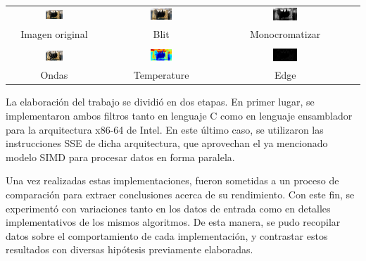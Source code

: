 \documentclass[a4paper]{article}
\begin{document}
\begin{center}
 \begin{tabular}{cccc}
   \includegraphics[width=0.2\textwidth]{imagenes/island.png} &
   \includegraphics[width=0.2\textwidth]{imagenes/island-blit.png} &
   \includegraphics[width=0.2\textwidth]{imagenes/island-monocromatizar.png} \\
   Imagen original & Blit & Monocromatizar \\
   \\
   \includegraphics[width=0.2\textwidth]{imagenes/island-ondas.png} &
   \includegraphics[width=0.2\textwidth]{imagenes/island-temperature.png} &
   \includegraphics[width=0.2\textwidth]{imagenes/island-edge.png} \\
   Ondas & Temperature & Edge \\
 \end{tabular}
\end{center}
  
  La elaboración del trabajo se dividió en dos etapas. En primer lugar, se implementaron ambos filtros tanto en lenguaje C como en lenguaje ensamblador para la arquitectura x86-64 de Intel. En este último caso, se utilizaron las instrucciones SSE de dicha arquitectura, que aprovechan el ya mencionado modelo SIMD para procesar datos en forma paralela.

  Una vez realizadas estas implementaciones, fueron sometidas a un proceso de comparación para extraer conclusiones acerca de su rendimiento. Con este fin, se experimentó con variaciones tanto en los datos de entrada como en detalles implementativos de los mismos algoritmos. De esta manera, se pudo recopilar datos sobre el comportamiento de cada implementación, y contrastar estos resultados con diversas hipótesis previamente elaboradas.
\end{document}
